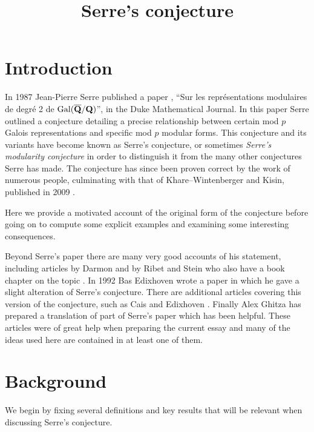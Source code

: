 \documentclass[a4paper,12pt]{article}
\title{Serre's conjecture}
\author{}
\date{}
\begin{document}
\maketitle
\vspace{-45pt}
\tableofcontents
\clearpage


\section{Introduction}
In 1987 Jean-Pierre Serre published a paper \cite{Serre87}, ``Sur les repr\'esentations modulaires de degr\'e 2 de $\operatorname{Gal}(\overline{\mathbf{Q}}/\mathbf{Q})$'', in the Duke Mathematical Journal.
In this paper Serre outlined a conjecture detailing a precise relationship between certain mod $p$ Galois representations and specific mod $p$ modular forms.
This conjecture and its variants have become known as Serre's conjecture, or sometimes \emph{Serre's modularity conjecture} in order to distinguish it from the many other conjectures Serre has made.
The conjecture has since been proven correct by the work of numerous people, culminating with that of Khare--Wintenberger and Kisin, published in 2009 \cite{KWI,KWII,Kisin}.

Here we provide a motivated account of the original form of the conjecture before going on to compute some explicit examples and examining some interesting consequences.

Beyond Serre's paper there are many very good accounts of his statement, including articles by Darmon \cite{Darmon} and by Ribet and Stein \cite{RibetStein} who also have a book chapter on the topic \cite{RibetSteinBook}.
In 1992 Bas Edixhoven wrote a paper \cite{EdixhovenWeight} in which he gave a slight alteration of Serre's conjecture.
There are additional articles covering this version of the conjecture, such as Cais \cite{Cais} and Edixhoven \cite{Edixhoven}.
Finally Alex Ghitza has prepared a translation of part of Serre's paper \cite{Ghitza} which has been helpful.
These articles were of great help when preparing the current essay and many of the ideas used here are contained in at least one of them.


\section{Background}
We begin by fixing several definitions and key results that will be relevant when discussing Serre's conjecture.
\end{document}
